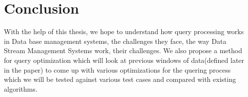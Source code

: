 \section{Conclusion}
\label{sec:Conclusion}
With the help of this thesis, we hope to understand how query processing works in Data base management systems, the challenges they face, the way Data Stream Management Systems work, their challenges. We also propose a method for query optimization which will look at previous windows of data(defined later in the paper) to come up with various optimizations for the quering process which we will be tested against various test cases and compared with existing algorithms.
